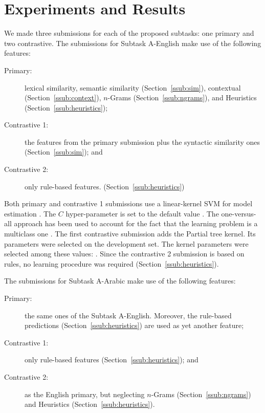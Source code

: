 \section{Experiments and Results}
\label{sec:experiments}

We made three submissions for each of the proposed subtasks: one primary and 
two contrastive. 
The submissions for Subtask A-English make use of the following features: 
\begin{description}
\item[Primary:] 
  lexical similarity, semantic similarity (Section~\ref{ssub:sim}), contextual 
  (Section~\ref{ssub:context}), $n$-Grams (Section~\ref{ssub:ngrams}), and
  Heuristics (Section~\ref{ssub:heuristics}); 
\item[Contrastive 1:] 
  the features from the primary submission plus the syntactic similarity ones 
  (Section~\ref{ssub:sim}); and
\item[Contrastive 2:] 
  only rule-based features. 
(Section~\ref{ssub:heuristics})
\end{description}
% 
Both primary and contrastive 1 submissions use a linear-kernel SVM for model 
estimation \cite{}. The $C$ hyper-parameter is set to the 
default value . The one-versus-all approach has been used to account 
for the fact that the learning problem is a multiclass one . 
The first contrastive submission adds the Partial tree kernel. Its parameters 
were selected on the development set. The kernel parameters were selected among 
these values: . 
Since the contrastive 2 submission is based on rules, no learning procedure was 
required (Section~\ref{ssub:heuristics}).

The submissions for Subtask A-Arabic make use of the following features:
\begin{description}
\item[Primary:] 
  the same ones of the Subtask A-English. Moreover, the rule-based predictions 
  (Section~\ref{ssub:heuristics}) are used as yet another feature;
\item[Contrastive 1:] only rule-based features (Section~\ref{ssub:heuristics}); 
and 
\item[Contrastive 2:] as the English primary, but neglecting $n$-Grams 
  (Section~\ref{ssub:ngrams}) and Heuristics (Section~\ref{ssub:heuristics}). 
 \end{description}

